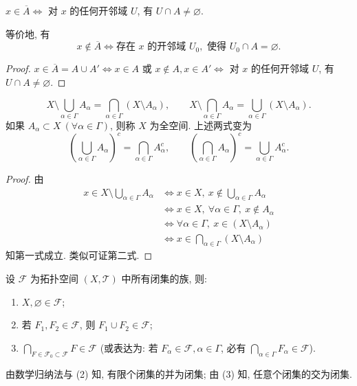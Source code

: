 \begin{theorem}\label{thm:7.1.1}
$x \in \overline{A} \iff$ 对 $x$ 的任何开邻域 $U$, 有 $U \cap A \neq \varnothing$.

等价地, 有
\[
  x \notin \overline{A} \iff \text{存在 } x \text{ 的开邻域 } U_0,\text{ 使得 } U_0 \cap A = \varnothing.
\]
\end{theorem}

\begin{proof}
$x \in \overline{A} = A \cup A' \iff x \in A$ 或 $x \notin A, x \in A' \iff$ 对 $x$ 的任何开邻域 $U$, 有 $U \cap A \neq \varnothing$. \qedhere
\end{proof}

\begin{lemma}[De Morgan 公式]\label{lem:7.1.1}
\[
  X \setminus \bigcup_{\alpha \in \Gamma} A_\alpha = \bigcap_{\alpha \in \Gamma} (X \setminus A_\alpha), \qquad
  X \setminus \bigcap_{\alpha \in \Gamma} A_\alpha = \bigcup_{\alpha \in \Gamma} (X \setminus A_\alpha).
\]
如果 $A_\alpha \subset X\ (\forall \alpha \in \Gamma)$, 则称 $X$ 为全空间. 上述两式变为
\[
  \left(\bigcup_{\alpha \in \Gamma} A_\alpha\right)^c = \bigcap_{\alpha \in \Gamma} A_\alpha^c, \qquad
  \left(\bigcap_{\alpha \in \Gamma} A_\alpha\right)^c = \bigcup_{\alpha \in \Gamma} A_\alpha^c.
\]
\end{lemma}

\begin{proof}
由
\begin{align*}
  x \in X \setminus \bigcup_{\alpha \in \Gamma} A_\alpha
  &\iff x \in X,\ x \notin \bigcup_{\alpha \in \Gamma} A_\alpha \\
  &\iff x \in X,\ \forall \alpha \in \Gamma,\ x \notin A_\alpha \\
  &\iff \forall \alpha \in \Gamma,\ x \in (X \setminus A_\alpha) \\
  &\iff x \in \bigcap_{\alpha \in \Gamma} (X \setminus A_\alpha)
\end{align*}
知第一式成立. 类似可证第二式. \qedhere
\end{proof}

\begin{theorem}[闭集性质]\label{thm:7.1.2}
设 $\mathcal{F}$ 为拓扑空间 $(X, \mathcal{T})$ 中所有闭集的族, 则:
\begin{enumerate}
  \item $X, \varnothing \in \mathcal{F}$;
  \item 若 $F_1, F_2 \in \mathcal{F}$, 则 $F_1 \cup F_2 \in \mathcal{F}$;
  \item $\bigcap_{F \in \mathcal{F}_0 \subset \mathcal{F}} F \in \mathcal{F}$ (或表达为: 若 $F_\alpha \in \mathcal{F}, \alpha \in \Gamma$, 必有 $\bigcap_{\alpha \in \Gamma} F_\alpha \in \mathcal{F}$).
\end{enumerate}
由数学归纳法与 (2) 知, 有限个闭集的并为闭集; 由 (3) 知, 任意个闭集的交为闭集.
\end{theorem}

